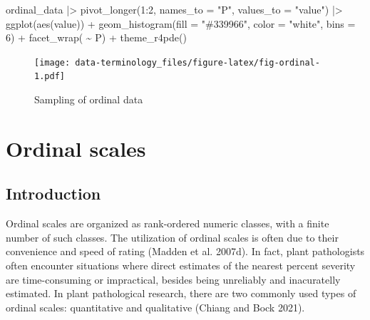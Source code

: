 \documentclass[
  letterpaper,
]{book}
\newenvironment{Shaded}{\begin{snugshade}}{\end{snugshade}}
\newcommand{\AttributeTok}[1]{\textcolor[rgb]{0.40,0.45,0.13}{#1}}
\newcommand{\DecValTok}[1]{\textcolor[rgb]{0.68,0.00,0.00}{#1}}
\newcommand{\FunctionTok}[1]{\textcolor[rgb]{0.28,0.35,0.67}{#1}}
\newcommand{\NormalTok}[1]{\textcolor[rgb]{0.00,0.23,0.31}{#1}}
\newcommand{\SpecialCharTok}[1]{\textcolor[rgb]{0.37,0.37,0.37}{#1}}
\newcommand{\StringTok}[1]{\textcolor[rgb]{0.13,0.47,0.30}{#1}}
\begin{document}
\begin{Shaded}
\begin{Highlighting}[]
\NormalTok{ordinal\_data }\SpecialCharTok{|\textgreater{}}
  \FunctionTok{pivot\_longer}\NormalTok{(}\DecValTok{1}\SpecialCharTok{:}\DecValTok{2}\NormalTok{, }\AttributeTok{names\_to =} \StringTok{"P"}\NormalTok{,}
               \AttributeTok{values\_to =} \StringTok{"value"}\NormalTok{) }\SpecialCharTok{|\textgreater{}}
  \FunctionTok{ggplot}\NormalTok{(}\FunctionTok{aes}\NormalTok{(value)) }\SpecialCharTok{+}
  \FunctionTok{geom\_histogram}\NormalTok{(}\AttributeTok{fill =} \StringTok{"\#339966"}\NormalTok{,}
                 \AttributeTok{color =} \StringTok{"white"}\NormalTok{,}
                 \AttributeTok{bins =} \DecValTok{6}\NormalTok{) }\SpecialCharTok{+}
  \FunctionTok{facet\_wrap}\NormalTok{( }\SpecialCharTok{\textasciitilde{}}\NormalTok{ P) }\SpecialCharTok{+}
  \FunctionTok{theme\_r4pde}\NormalTok{()}
\end{Highlighting}
\end{Shaded}

\begin{figure}

{\centering \texttt{[image: data-terminology\_files/figure-latex/fig-ordinal-1.pdf]}

}

\caption{\label{fig-ordinal}Sampling of ordinal data}

\end{figure}

\hypertarget{ordinal-scales}{%
\chapter{Ordinal scales}\label{ordinal-scales}}

\hypertarget{introduction-1}{%
\section{Introduction}\label{introduction-1}}

Ordinal scales are organized as rank-ordered numeric classes, with a
finite number of such classes. The utilization of ordinal scales is
often due to their convenience and speed of rating (Madden et al.
2007d). In fact, plant pathologists often encounter situations where
direct estimates of the nearest percent severity are time-consuming or
impractical, besides being unreliably and inacuratelly estimated. In
plant pathological research, there are two commonly used types of
ordinal scales: quantitative and qualitative (Chiang and Bock 2021).
\end{document}

